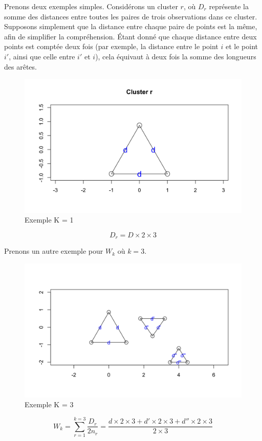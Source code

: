 Prenons deux exemples simples. Considérons un cluster $r$, où $D_r$ représente la somme des distances entre toutes les paires de trois observations dans ce cluster. Supposons simplement que la distance entre chaque paire de points est la même, afin de simplifier la compréhension. Étant donné que chaque distance entre deux points est comptée deux fois (par exemple, la distance entre le point $i$ et le point $i'$, ainsi que celle entre $i'$ et $i$), cela équivaut à deux fois la somme des longueurs des arêtes.
\begin{figure}[H]
    \centering
    \includegraphics[width=1\linewidth]{images/cluster r.png}
    \caption{Exemple K = 1}
    \label{fig:enter-label}
\end{figure}

$$
D_r = D \times 2 \times 3
$$

Prenons un autre exemple pour $W_k$ où $k = 3$.
\begin{figure}[H]
    \centering
    \includegraphics[width=0.9\linewidth]{images/3triangles.png}
    \caption{Exemple K = 3}
    \label{fig:enter-label}
\end{figure}
$$
W_k = \sum_{r=1}^{k = 3} \frac{D_r}{2 n_r} =\frac{ d \times 2 \times 3 + d' \times 2 \times 3 + d'' \times 2 \times 3}{2\times3}
$$

